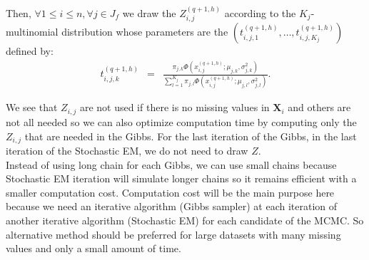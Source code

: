 \documentclass[12pt,a4paper]{report}
\begin{document}
	Then, $\forall 1\leq i \leq n, \forall j \in J_f$ we draw the $Z_{i,j}^{(q+1,h)}$ according to the $K_j$-multinomial distribution whose parameters are the $(t_{i,j,1}^{(q+1,h)},\dots ,t_{i,j,K_j}^{(q+1,h)})$ defined by:
	\begin{eqnarray}
		t_{i,j,k}^{(q+1,h)}&=&\frac{\pi_{j,k}\Phi(x_{i,j}^{(q+1,h)};\mu_{j,k},\sigma_{j,k}^2)}{\sum_{l=1}^{K_j}\pi_{j,l}\Phi(x_{i,j}^{(q+1,h)};\mu_{j,l},\sigma_{j,l}^2) }. \nonumber 
	\end{eqnarray}
		
	
	
	We see that $Z_{i,j}$ are not used if there is no missing values in $\boldsymbol{X}_i$ and others are not all needed so we can also optimize computation time by  computing only the $Z_{i,j}$ that are needed in the Gibbs.
	For the last iteration of the Gibbs, in the last iteration of the Stochastic EM, we do not need to draw $Z$.	\\
	
	Instead of using long chain for each Gibbs, we can use small chains because Stochastic EM iteration will simulate longer chains so it remains efficient with a smaller computation cost.
	Computation cost will be the main purpose here because we need an iterative algorithm (Gibbs sampler) at each iteration of another iterative algorithm (Stochastic EM) for each candidate of the MCMC.
	So alternative method should be preferred for large datasets with many missing values and only a small amount of time.\\
	
\end{document}
